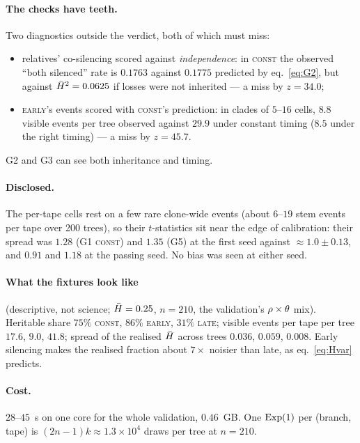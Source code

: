 \paragraph{The checks have teeth.} Two diagnostics outside the verdict, both of which must miss:
\begin{itemize}
  \item relatives' co-silencing scored against \emph{independence}: in \textsc{const} the observed
        ``both silenced'' rate is $0.1763$ against $0.1775$ predicted by eq.~\eqref{eq:G2}, but against
        $\bar H^2=0.0625$ if losses were not inherited --- a miss by $z=34.0$;
  \item \textsc{early}'s events scored with \textsc{const}'s prediction: in clades of $5$--$16$ cells,
        $8.8$ visible events per tree observed against $29.9$ under constant timing ($8.5$ under the
        right timing) --- a miss by $z=45.7$.
\end{itemize}
G2 and G3 can see both inheritance and timing.

\paragraph{Disclosed.} The per-tape cells rest on a few rare clone-wide events (about $6$--$19$ stem
events per tape over 200 trees), so their $t$-statistics sit near the edge of calibration: their spread
was $1.28$ (G1 \textsc{const}) and $1.35$ (G5) at the first seed against $\approx1.0\pm0.13$, and $0.91$
and $1.18$ at the passing seed. No bias was seen at either seed.

\paragraph{What the fixtures look like} (descriptive, not science; $\bar H=0.25$, $n=210$, the
validation's $\rho\times\theta$ mix). Heritable share $75\%$ \textsc{const}, $86\%$ \textsc{early}, $31\%$
\textsc{late}; visible events per tape per tree $17.6$, $9.0$, $41.8$; spread of the realised $\bar H$
across trees $0.036$, $0.059$, $0.008$. Early silencing makes the realised fraction about $7\times$
noisier than late, as eq.~\eqref{eq:Hvar} predicts.

\paragraph{Cost.} $28$--$45$~s on one core for the whole validation, $0.46$~GB. One $\operatorname{Exp}(1)$ per
(branch, tape) is $(2n-1)k\approx1.3\times10^4$ draws per tree at $n=210$.

